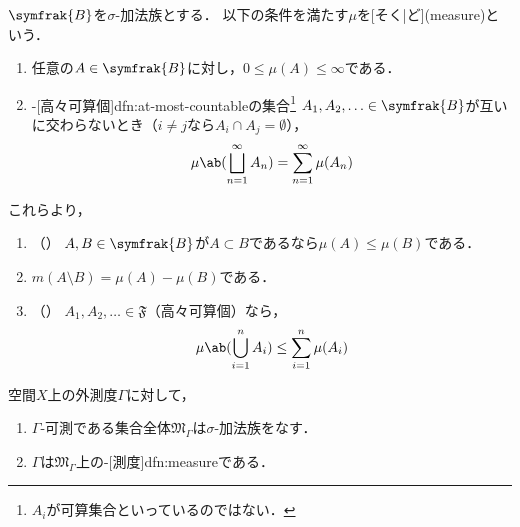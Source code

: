 \documentclass[../sotsu.tex]{subfiles}
\begin{document}
\begin{definition}
    \label{dfn:measure}
    $\symfrak{B}$を$\sigma$-加法族とする．
    以下の条件を満たす$\mu$を[そく|ど](measure)という．
    \begin{enumerate}
        \item 任意の$A \in \symfrak{B}$に対し，$0 \leq \mu(A) \leq \infty$である．
        \item {}-[高々可算個]{dfn:at-most-countable}の集合\footnote{$A_i$が可算集合といっているのではない．}%
            $A_1, A_2, \dotsc \in \symfrak{B}$が互いに交わらないとき（$i \neq j$なら$A_i \cap A_j = \emptyset$），
            \begin{equation}
                \mu \ab( \bigsqcup_{n=1}^{\infty} A_n ) 
                    = \sum_{n=1}^{\infty} \mu (A_n)
            \end{equation}
    \end{enumerate}
    これらより，
    \begin{enumerate}[resume]
        \item \label{measure:monotonicity}（）
            $A, B \in \symfrak{B}$が$A \subset B$であるなら$\mu(A) \leq \mu(B)$である．
        \item $m(A \setminus B) = \mu (A) - \mu (B)$である．
        \item \label{measure:subadditivity}（）
            $A_1, A_2, \dotsc \in 𝔉$（高々可算個）なら，
            \begin{equation*}
                \mu \ab( \bigcup_{i=1}^{n} A_i ) \leq \sum_{i=1}^{n} \mu(A_i)
            \end{equation*}
    \end{enumerate}
\end{definition}


\begin{proposition}
    空間$X$上の外測度$Γ$に対して，
    \begin{enumerate}
        \item $Γ$-可測である集合全体$𝔐_Γ$は$\sigma$-加法族をなす．
        \item $Γ$は$𝔐_Γ$上の-[測度]{dfn:measure}である．
    \end{enumerate}
\end{proposition}
\end{document}
